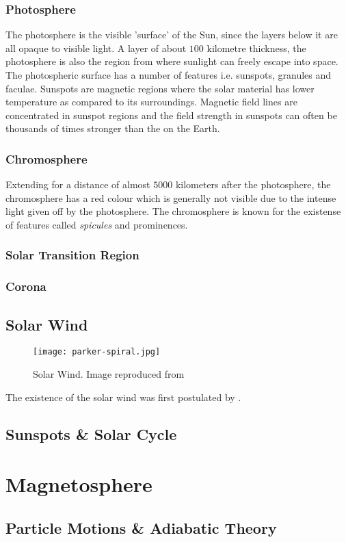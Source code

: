 \subsubsection*{Photosphere}

The photosphere is the visible 'surface' of the Sun, since the layers below it are all opaque to visible light.
A layer of about $100$ kilometre thickness, the photosphere is also the region from where sunlight can freely 
escape into space. The photospheric surface has a number of features i.e. sunspots, granules and faculae. 
Sunspots are magnetic regions where the solar material has lower temperature as compared to its surroundings. 
Magnetic field lines are concentrated in sunspot regions and the field strength in sunspots can often be thousands 
of times stronger than the on the Earth.

\subsubsection*{Chromosphere}

Extending for a distance of almost $5000$ kilometers after the photosphere, the chromosphere has a red colour which 
is generally not visible due to the intense light given off by the photosphere. The chromosphere is known for the 
existense of features called \emph{spicules} and prominences. 


\subsubsection*{Solar Transition Region}

\subsubsection*{Corona}

\subsection*{Solar Wind}

\begin{wrapfigure}{l}{0.4\textwidth}
    \centering\texttt{[image: parker-spiral.jpg]}
    \caption{
        \small Solar Wind. Image reproduced from \citet{Owens2013}}
    \label{fig:spacex}
\end{wrapfigure}


The existence of the solar wind was first postulated by \citet{ParkerSolarWind}.

\subsection*{Sunspots \& Solar Cycle}

\section{Magnetosphere}\label{sec:mag}

\subsection*{Particle Motions \& Adiabatic Theory} \label{sec:plasmadiff}

\clearpage



